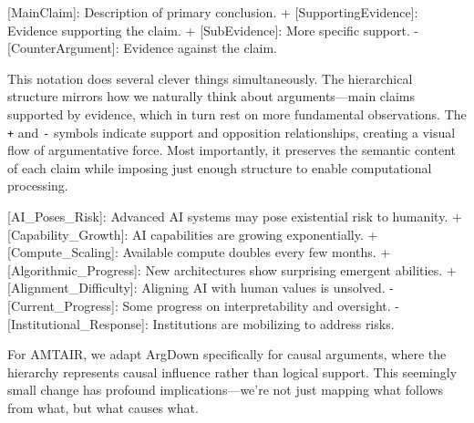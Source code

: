 \documentclass[
  11pt,
  letterpaper,
  openany]{book}
\newenvironment{Shaded}{\begin{snugshade}}{\end{snugshade}}
\newcommand{\CommentTok}[1]{\textcolor[rgb]{0.37,0.37,0.37}{#1}}
\newcommand{\NormalTok}[1]{\textcolor[rgb]{0.00,0.23,0.31}{#1}}
\newcommand{\OtherTok}[1]{\textcolor[rgb]{0.00,0.23,0.31}{#1}}
\newcommand{\SpecialStringTok}[1]{\textcolor[rgb]{0.13,0.47,0.30}{#1}}
\begin{document}
\begin{Shaded}
\begin{Highlighting}[]
\OtherTok{[MainClaim]: }\NormalTok{Description of primary conclusion.}
\SpecialStringTok{ + }\CommentTok{[}\OtherTok{SupportingEvidence}\CommentTok{]}\NormalTok{: Evidence supporting the claim.}
\SpecialStringTok{   + }\CommentTok{[}\OtherTok{SubEvidence}\CommentTok{]}\NormalTok{: More specific support.}
\SpecialStringTok{ {-} }\CommentTok{[}\OtherTok{CounterArgument}\CommentTok{]}\NormalTok{: Evidence against the claim.}
\end{Highlighting}
\end{Shaded}

This notation does several clever things simultaneously. The
hierarchical structure mirrors how we naturally think about
arguments---main claims supported by evidence, which in turn rest on
more fundamental observations. The \texttt{+} and \texttt{-} symbols
indicate support and opposition relationships, creating a visual flow of
argumentative force. Most importantly, it preserves the semantic content
of each claim while imposing just enough structure to enable
computational processing.

\begin{Shaded}
\begin{Highlighting}[]
\OtherTok{[AI\_Poses\_Risk]: }\NormalTok{Advanced AI systems may pose existential risk to humanity.}
\SpecialStringTok{ + }\CommentTok{[}\OtherTok{Capability\_Growth}\CommentTok{]}\NormalTok{: AI capabilities are growing exponentially.}
\SpecialStringTok{   + }\CommentTok{[}\OtherTok{Compute\_Scaling}\CommentTok{]}\NormalTok{: Available compute doubles every few months.}
\SpecialStringTok{   + }\CommentTok{[}\OtherTok{Algorithmic\_Progress}\CommentTok{]}\NormalTok{: New architectures show surprising emergent abilities.}
\SpecialStringTok{ + }\CommentTok{[}\OtherTok{Alignment\_Difficulty}\CommentTok{]}\NormalTok{: Aligning AI with human values is unsolved.}
\SpecialStringTok{   {-} }\CommentTok{[}\OtherTok{Current\_Progress}\CommentTok{]}\NormalTok{: Some progress on interpretability and oversight.}
\SpecialStringTok{ {-} }\CommentTok{[}\OtherTok{Institutional\_Response}\CommentTok{]}\NormalTok{: Institutions are mobilizing to address risks.}
\end{Highlighting}
\end{Shaded}

For AMTAIR, we adapt ArgDown specifically for causal arguments, where
the hierarchy represents causal influence rather than logical support.
This seemingly small change has profound implications---we're not just
mapping what follows from what, but what causes what.
\end{document}
